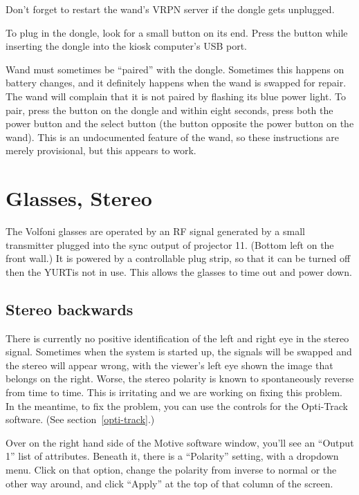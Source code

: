 \documentclass[11pt]{article}
\newcommand{\yurt}{YURT}
\begin{document}
Don't forget to restart the wand's VRPN server if the dongle gets unplugged.


To plug in the dongle, look for a small button on its end.  Press the
button while inserting the dongle into the kiosk computer's USB port.

Wand must sometimes be ``paired'' with the dongle.  Sometimes this
happens on battery changes, and it definitely happens when the wand is
swapped for repair.  The wand will complain that it is not paired by
flashing its blue power light.  To pair, press the button on the
dongle and within eight seconds, press both the power button and the
select button (the button opposite the power button on the wand).  This is an
undocumented feature of the wand, so these instructions are merely
provisional, but this appears to work.


\section{Glasses, Stereo}

The Volfoni glasses are operated by an RF signal generated by a small
transmitter plugged into the sync output of projector 11.  (Bottom
left on the front wall.)  It is powered by a controllable plug strip,
so that it can be turned off then the \yurt is not in use.  This allows
the glasses to time out and power down.


\subsection{Stereo backwards}

There is currently no positive identification of the left and right
eye in the stereo signal.  Sometimes when the system is started
up, the signals will be swapped and the stereo will appear wrong, with
the viewer's left eye shown the image that belongs on the right.
Worse, the stereo polarity is known to spontaneously reverse from time to
time.  This is irritating and we are working on fixing this problem.
In the meantime, to fix the problem, you can use the controls for the
Opti-Track software.  (See section~\ref{opti-track}.)

Over on the right hand side of the Motive software window, you'll see
an ``Output 1'' list of attributes.  Beneath it, there is a
``Polarity'' setting, with a dropdown menu.  Click on that option,
change the polarity from inverse to normal or the other way around,
and click ``Apply'' at the top of that column of the screen.
\end{document}

